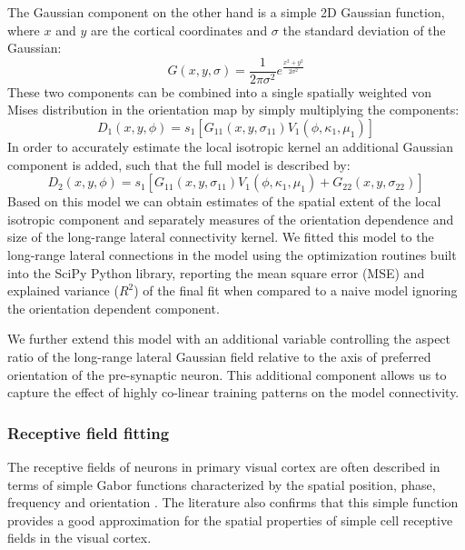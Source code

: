 The Gaussian component on the other hand is a simple 2D Gaussian
function, where $x$ and $y$ are the cortical coordinates and $\sigma$
the standard deviation of the Gaussian:
\begin{equation}
G(x, y, \sigma) = \frac{1}{2 \pi \sigma^2} e^{\frac{x^2+y^2}{2
    \sigma^2}}
\end{equation}
These two components can be combined into a single spatially weighted
von Mises distribution in the orientation map by simply multiplying the
components:
\begin{equation}
D_1(x, y, \phi) = s_1 [G_{11}(x, y, \sigma_{11}) V_1(\phi, \kappa_1, \mu_1)]
\end{equation}
In order to accurately estimate the local isotropic kernel an
additional Gaussian component is added, such that the full model is
described by:
\begin{equation}
D_2(x, y, \phi) = s_1 [G_{11}(x, y, \sigma_{11}) V_1(\phi, \kappa_1, \mu_1) + G_{22}(x, y, \sigma_{22})]
\end{equation}
Based on this model we can obtain estimates of the spatial extent of
the local isotropic component and separately measures of the
orientation dependence and size of the long-range lateral connectivity
kernel. We fitted this model to the long-range lateral connections in
the model using the optimization routines built into the SciPy Python
library, reporting the mean square error (MSE) and explained variance
($R^2$) of the final fit when compared to a naive model ignoring the
orientation dependent component.

We further extend this model with an additional variable controlling
the aspect ratio of the long-range lateral Gaussian field relative to
the axis of preferred orientation of the pre-synaptic neuron. This
additional component allows us to capture the effect of highly
co-linear training patterns on the model connectivity.

\subsubsection{Receptive field fitting} \label{rffitting}

The receptive fields of neurons in primary visual cortex are often
described in terms of simple Gabor functions characterized by the
spatial position, phase, frequency and orientation
\citep{Jones1987,Ringach2002b}. The literature also confirms that this
simple function provides a good approximation for the spatial
properties of simple cell receptive fields in the visual cortex.

